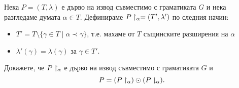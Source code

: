 \begin{problem}
  Нека $P = (T,\lambda)$ е дърво на извод съвместимо с граматиката $G$ и нека разгледаме думата $\alpha \in T$.
  Дефинираме ${P}\upharpoonright_{\alpha} = (T',\lambda')$ по следния начин:
  \begin{itemize}
  \item
    $T' = T \setminus \{ \gamma \in T\mid \alpha \prec \gamma\}$, т.е. махаме от $T$ същинските разширения на $\alpha$
  \item
    $\lambda'(\gamma) = \lambda(\gamma)$ за $\gamma \in T'$.
  \end{itemize}
  Докажете, че ${P}\upharpoonright_{\alpha}$ е дърво на извод съвместимо с граматиката $G$ и 
  \[P = ({P}\upharpoonright_{\alpha}) \odot ({P}\downharpoonright_{\alpha}).\]
\end{problem}
